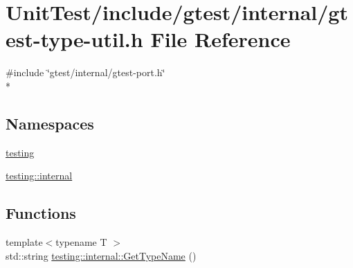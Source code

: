 \hypertarget{gtest-type-util_8h}{\section{Unit\+Test/include/gtest/internal/gtest-\/type-\/util.h File Reference}
\label{gtest-type-util_8h}
}
{\ttfamily \#include \char`\"{}gtest/internal/gtest-\/port.\+h\char`\"{}}\\*
\subsection*{Namespaces}
\begin{DoxyCompactItemize}
\item 
 \hyperlink{namespacetesting}{testing}
\item 
 \hyperlink{namespacetesting_1_1internal}{testing\+::internal}
\end{DoxyCompactItemize}
\subsection*{Functions}
\begin{DoxyCompactItemize}
\item 
{\footnotesize template$<$typename T $>$ }\\std\+::string \hyperlink{namespacetesting_1_1internal_a635606b4731f843c86ec8ca51cab83a1}{testing\+::internal\+::\+Get\+Type\+Name} ()
\end{DoxyCompactItemize}
